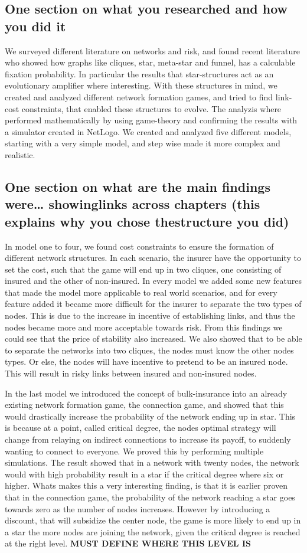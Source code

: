 \subsection{One section on what you researched and how you did it}
We surveyed different literature on networks and risk, and found recent literature who showed how graphs like cliques, star, meta-star and funnel, has a calculable fixation probability. In particular the results that star-structures act as an evolutionary amplifier where interesting. 
With these structures in mind, we created and analyzed different network formation games, and tried to find link-cost constraints, that enabled these structures to evolve. 
The analyzis where performed mathematically by using game-theory and confirming the results with a simulator created in NetLogo.
We created and analyzed five different models, starting with a very simple model, and step wise made it more complex and realistic. 
\subsection{One section on what are the main findings were… showinglinks across chapters (this explains why you chose thestructure you did)}
In model one to four, we found cost constraints to ensure the formation of different network structures. In each scenario, the insurer have the opportunity to set the cost, such that the game will end up in two cliques, one consisting of insured and the other of non-insured. 
In every model we added some new features that made the model more applicable to real world scenarios, and for every feature added it became more difficult for the insurer to separate the two types of nodes. This is due to the increase in incentive of establishing links, and thus the nodes became more and more acceptable towards risk. From this findings we could see that the price of stability also increased. 
We also showed that to be able to separate the networks into two cliques, the nodes must know the other nodes types. Or else, the nodes will have incentive to pretend to be an insured node. This will result in risky links between insured and non-insured nodes. 

In the last model we introduced the concept of bulk-insurance into an already existing network formation game, the connection game, and showed that this would drastically increase the probability of the network ending up in star. This is because at a point, called critical degree, the nodes optimal strategy will change from relaying on indirect connections to increase its payoff, to suddenly wanting to connect to everyone. 
We proved this by performing multiple simulations. The result showed that in a network with twenty nodes, the network would with high probability result in a star if the critical degree where six or higher. 
Whats makes this a very interesting finding, is that it is earlier proven that in the connection game, the probability of the network reaching a star goes towards zero as the number of nodes increases. However by introducing a discount, that will subsidize the center node, the game is more likely to end up in a star the more nodes are joining the network, given the critical degree is reached at the right level. \textbf{MUST DEFINE WHERE THIS LEVEL IS}

